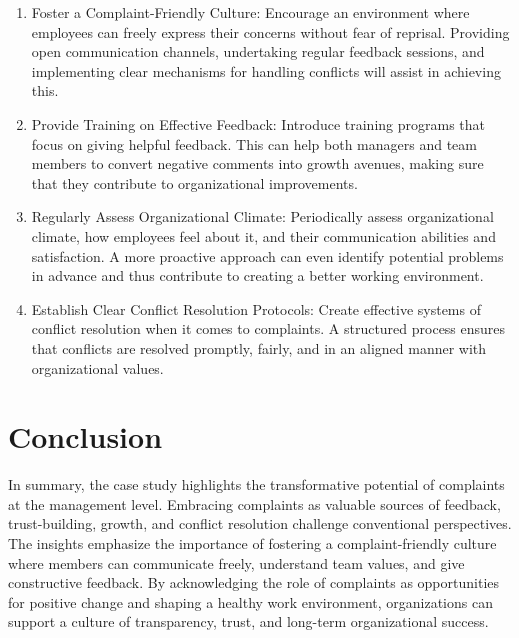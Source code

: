 \documentclass[a4paper,12pt]{report}
\begin{document}
\begin{enumerate}
    \item Foster a Complaint-Friendly Culture:
Encourage an environment where employees can freely express their concerns without fear of reprisal. Providing open communication channels, undertaking regular feedback sessions, and implementing clear mechanisms for handling conflicts will assist in achieving this.

    \item Provide Training on Effective Feedback:
Introduce training programs that focus on giving helpful feedback. This can help both managers and team members to convert negative comments into growth avenues, making sure that they contribute to organizational improvements.

    \item Regularly Assess Organizational Climate:
Periodically assess organizational climate, how employees feel about it, and their communication abilities and satisfaction. A more proactive approach can even identify potential problems in advance and thus contribute to creating a better working environment.

    \item Establish Clear Conflict Resolution Protocols:
Create effective systems of conflict resolution when it comes to complaints. A structured process ensures that conflicts are resolved promptly, fairly, and in an aligned manner with organizational values.
\end{enumerate}

\newpage
\section{Conclusion}
In summary, the case study highlights the transformative potential of complaints at the management level. Embracing complaints as valuable sources of feedback, trust-building, growth, and conflict resolution challenge conventional perspectives. The insights emphasize the importance of fostering a complaint-friendly culture where members can communicate freely, understand team values, and give constructive feedback. By acknowledging the role of complaints as opportunities for positive change and shaping a healthy work environment, organizations can support a culture of transparency, trust, and long-term organizational success.

\newpage
\end{document}
